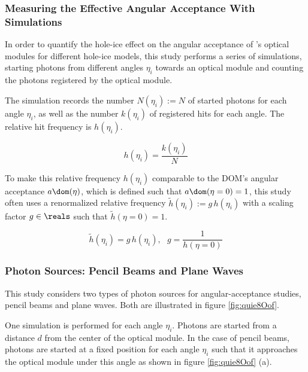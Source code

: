 \newpage
\subsubsection{Measuring the Effective Angular Acceptance With Simulations}
\label{sec:measuring_angular_acceptance_with_simulations}\label{sec:gauging}

In order to quantify the hole-ice effect on the angular acceptance of \icecube's optical modules for different hole-ice models, this study performs a series of simulations, starting photons from different angles $\eta_i$ towards an optical module and counting the photons registered by the optical module.

The simulation records the number $N(\eta_i):= N$ of started photons for each angle $\eta_i$, as well as the number $k(\eta_i)$ of registered hits for each angle. The relative hit frequency is $h(\eta_i)$.

\begin{equation}
  h(\eta_i) = \frac{k(\eta_i)}{N}
\end{equation}

To make this relative frequency $h(\eta_i)$ comparable to the DOM's angular acceptance $a\dom(\eta)$, which is defined such that $a\dom(\eta = 0) = 1$, this study often uses a renormalized relative frequency $\tilde{h}(\eta_i):=g\,h(\eta_i)$ with a scaling factor $g\in\reals$ such that $\tilde{h}(\eta = 0) = 1$.

\begin{equation}
  \tilde{h}(\eta_i) = g\,h(\eta_i), \ \ \
  g = \frac{1}{h(\eta = 0)}
  \label{eq:gauging_factor}
\end{equation}


\newpage
\subsubsection{Photon Sources: Pencil Beams and Plane Waves}
This study considers two types of photon sources for angular-acceptance studies, pencil beams and plane waves. Both are illustrated in figure \ref{fig:quie8Oof}.

One simulation is performed for each angle $\eta_i$. Photons are started from a distance $d$ from the center of the optical module. In the case of pencil beams, photons are started at a fixed position for each angle $\eta_i$ such that it approaches the optical module under this angle as shown in figure \ref{fig:quie8Oof} (a).

